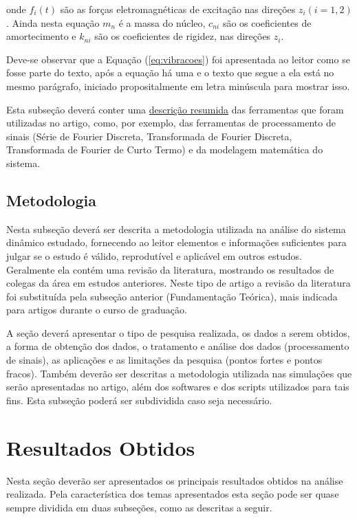 onde $f_i(t)$ são as forças eletromagnéticas de excitação nas direções $z_i (i=1,2)$.
Ainda nesta equação $m_n$ é a massa do núcleo, $c_{ni}$ são os coeficientes de amortecimento e $k_{ni}$ são os coeficientes de rigidez, nas direções $z_i$.

Deve-se observar que a Equação (\ref{eq:vibracoes}) foi apresentada ao leitor como se fosse parte do texto, após a equação há uma  e o texto que segue a ela está no mesmo parágrafo, iniciado propositalmente em letra minúscula para mostrar isso.

Esta subseção deverá conter uma \underline{descrição resumida} das ferramentas que foram utilizadas no artigo, como, por exemplo, das ferramentas de processamento de sinais (Série de Fourier Discreta, Transformada de Fourier Discreta, Transformada de Fourier de Curto Termo) e da modelagem matemática do sistema.

\subsection{Metodologia}

Nesta subseção deverá ser descrita a metodologia utilizada na análise do sistema dinâmico estudado, fornecendo ao leitor elementos e informações suficientes para julgar se o estudo é válido, reprodutível e aplicável em outros estudos.
Geralmente ela contém uma revisão da literatura, mostrando os resultados de colegas da área em estudos anteriores.
Neste tipo de artigo a revisão da literatura foi substituída pela subseção anterior (Fundamentação Teórica), mais indicada para artigos durante o curso de graduação.

A seção deverá apresentar o tipo de pesquisa realizada, os dados a serem obtidos, a forma de obtenção dos dados, o tratamento e análise dos dados (processamento de sinais), as aplicações e as limitações da pesquisa (pontos fortes e pontos fracos).
Também deverão ser descritas a metodologia utilizada nas simulações que serão apresentadas no artigo, além dos softwares e dos scripts utilizados para tais fins.
Esta subseção poderá ser subdividida caso seja necessário.

\section{Resultados Obtidos}

Nesta seção deverão ser apresentados os principais resultados obtidos na análise realizada.
Pela característica dos temas apresentados esta seção pode ser quase sempre dividida em duas subseções, como as descritas a seguir.

